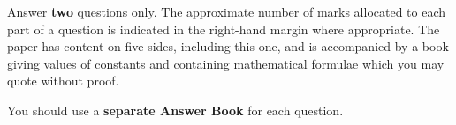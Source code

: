 \documentclass{NSTExam}
\begin{document}
\date{Monday 18th January 2021 :00 to 12:00} %
\begin{rubric}Answer \textbf{two} questions only.  The approximate number of marks allocated to each part of a question is indicated in the right-hand margin where appropriate. The paper has content on five sides, including this one, and is accompanied by a book giving values of constants and containing mathematical formulae which you may quote without proof.

You should use a \textbf{separate Answer Book} for each question.
\end{rubric}
 \warning



\clearpage

\vspace*{1cm}

\clearpage

\begin{questions}

\vspace{1cm}

\clearpage


\end{questions}


\endofpaper
\end{document}
